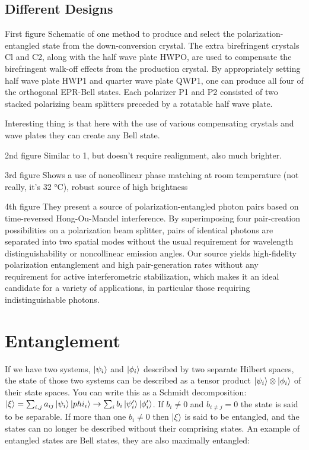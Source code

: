 \documentclass{article}
\begin{document}
\subsection{Different Designs}
First figure
Schematic of one method to produce and select the polarization-entangled state from the down-conversion crystal.
The extra birefringent crystals Cl and C2, along with the half wave plate HWPO, are used to compensate the birefringent
walk-off effects from the production crystal. By appropriately setting half wave plate HWP1 and quarter wave plate QWP1,
one can produce all four of the orthogonal EPR-Bell states. Each polarizer P1 and P2 consisted of two stacked polarizing
beam splitters preceded by a rotatable half wave plate.

Interesting thing is that here with the use of various compensating crystals and wave plates they can create any
Bell state.

2nd figure
Similar to 1, but doesn't require realignment, also much brighter.

3rd figure
Shows a use of noncollinear phase matching at room temperature (not really,
it's 32 °C), robust source of high brightness

4th figure
They present a source of polarization-entangled photon pairs based on time-reversed
Hong-Ou-Mandel interference. By superimposing four pair-creation possibilities on a polarization beam
splitter, pairs of identical photons are separated into two spatial modes without the usual requirement for
wavelength distinguishability or noncollinear emission angles. Our source yields high-fidelity polarization entanglement and high pair-generation rates without any requirement for active interferometric
stabilization, which makes it an ideal candidate for a variety of applications, in particular those requiring
indistinguishable photons.

\section{Entanglement}
If we have two systems, $\ket{\psi_i}$ and $\ket{\phi_i}$ described by two separate Hilbert spaces, the state of those two systems can be described as 
a tensor product $\ket{\psi_i} \otimes \ket{\phi_i}$ of their state spaces. You can write this as a Schmidt decomposition: $\ket{\xi} = \sum_{i,j} 
a_{ij} \ket{\psi_i}\ket{phi_i} \rightarrow \sum_i b_i \ket{\psi_i'} \ket{\phi_i'}$. If $b_i \ne 0$ and $b_{i \ne j} = 0$ the state is said to be separable.
If more than one $b_i \ne 0$ then $\ket{\xi}$ is said to be entangled, and the states can no longer be described without their comprising states.
An example of entangled states are Bell states, they are also maximally entangled:
\end{document}
